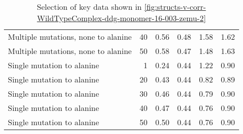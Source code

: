 \begin{table}
\begin{tabular}{lrrrrr}
 Multiple mutations, none to alanine &          40 &             0.56 &                    0.48 &               1.58 &                      1.62 \\
 Multiple mutations, none to alanine &          50 &             0.58 &                    0.47 &               1.48 &                      1.63 \\
          Single mutation to alanine &           1 &             0.24 &                    0.44 &               1.22 &                      0.90 \\
          Single mutation to alanine &          20 &             0.43 &                    0.44 &               0.82 &                      0.89 \\
          Single mutation to alanine &          30 &             0.46 &                    0.44 &               0.79 &                      0.90 \\
          Single mutation to alanine &          40 &             0.47 &                    0.44 &               0.76 &                      0.90 \\
          Single mutation to alanine &          50 &             0.50 &                    0.44 &               0.76 &                      0.90 \\
\bottomrule
\end{tabular}

\caption[]{Selection of key data shown in \cref{fig:structs-v-corr-WildTypeComplex-ddg-monomer-16-003-zemu-2}}
\label{tab:structs-v-corr-WildTypeComplex-ddg-monomer-16-003-zemu-2-underlying-data}
\end{table}
